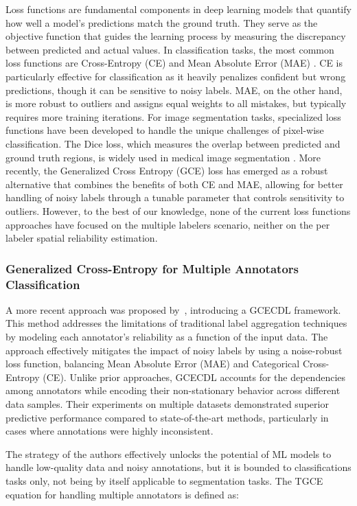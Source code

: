 Loss functions are fundamental components in deep learning models
that quantify how well a model's predictions match the ground truth.
They serve as the objective function that guides the learning process
by measuring the discrepancy between predicted and actual values. In
classification tasks, the most common loss functions are
Cross-Entropy (CE) and Mean Absolute Error (MAE)
\cite{ZhangEtAl2018}. CE is particularly
effective for classification as it heavily penalizes confident but
wrong predictions, though it can be sensitive to noisy labels. MAE,
on the other hand, is more robust to outliers and assigns equal
weights to all mistakes, but typically requires more training
iterations. For image segmentation tasks, specialized loss functions
have been developed to handle the unique challenges of pixel-wise
classification. The Dice loss, which measures the overlap between
predicted and ground truth regions, is widely used in medical image
segmentation \cite{ZhaoEtAl2020}. More recently, the Generalized
Cross Entropy (GCE) loss has emerged as a robust alternative that
combines the benefits of both CE and MAE, allowing for better
handling of noisy labels through a tunable parameter that controls
sensitivity to outliers. However, to the best of our knowledge, none
of the current loss functions approaches have focused on the multiple
labelers scenario, neither on the per labeler spatial reliability
estimation.

\subsubsection{Generalized Cross-Entropy for Multiple Annotators Classification}

A more recent approach was proposed by~\cite{TrianaEtAl2023},
introducing a \gls{GCECDL} framework. This method addresses the limitations of
traditional label aggregation techniques by modeling each annotator's
reliability as a function of the input data. The approach effectively
mitigates the impact of noisy labels by using a noise-robust loss
function, balancing Mean Absolute Error (MAE) and Categorical
Cross-Entropy (CE). Unlike prior approaches, \gls{GCECDL} accounts for the
dependencies among annotators while encoding their non-stationary
behavior across different data samples. Their experiments on
multiple datasets demonstrated superior predictive performance
compared to state-of-the-art methods, particularly in cases where
annotations were highly inconsistent.

The strategy of the authors effectively unlocks the potential of
\gls{ML} models to handle low-quality data and noisy annotations, but
it is bounded to classifications tasks only, not being by itself applicable to
segmentation tasks. The TGCE equation for handling multiple
annotators is defined as:


